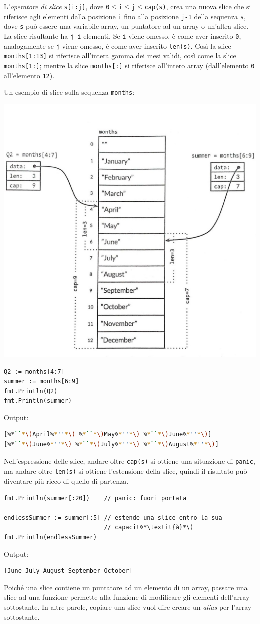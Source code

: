 L'\textit{operatore di slice} \verb|s[i:j]|, dove \verb|0|$\le$\verb|i|$\le$\verb|j|$\le$\verb|cap(s)|, crea una nuova slice che si riferisce agli elementi dalla posizione \verb|i| fino alla posizione \verb|j-1| della sequenza \verb|s|, dove \verb|s| può essere una variabile array, un puntatore ad un array o un'altra slice.
La slice risultante ha \verb|j-i| elementi.
Se \verb|i| viene omesso, è come aver inserito \verb|0|, analogamente se \verb|j| viene omesso, è come aver inserito \verb|len(s)|.
Così la slice \verb|months[1:13]| si riferisce all'intera gamma dei mesi validi, così come la slice \verb|months[1:]|;
mentre la slice \verb|months[:]| si riferisce all'intero array (dall'elemento \verb|0| all'elemento \verb|12|).

Un esempio di slice sulla sequenza \verb|months|:
\begin{center}
    \includegraphics[width=0.5\linewidth]{figures/figura3.1}
\end{center}
\begin{lstlisting}[frame=single, label={lst:lstlisting3-2.2}]
Q2 := months[4:7]
summer := months[6:9]
fmt.Println(Q2)
fmt.Println(summer)
\end{lstlisting}
Output:
\begin{lstlisting}[language=bash, frame=L, label={lst:lstlisting3-2.3}]
[%*``*\)April%*''*\) %*``*\)May%*''*\) %*``*\)June%*''*\)]
[%*``*\)June%*''*\) %*``*\)July%*''*\) %*``*\)August%*''*\)]
\end{lstlisting}
Nell'espressione delle slice, andare oltre \verb|cap(s)| si ottiene una situazione di \verb|panic|, ma andare oltre \verb|len(s)| si ottiene l'estensione della slice, quindi il risultato può diventare più ricco di quello di partenza.
\begin{lstlisting}[frame=single, label={lst:lstlisting3-2.4}]
fmt.Println(summer[:20])    // panic: fuori portata

endlessSummer := summer[:5] // estende una slice entro la sua
                            // capacit%*\textit{à}*\)
fmt.Println(endlessSummer)
\end{lstlisting}
Output:
\begin{lstlisting}[language=bash, frame=L, label={lst:lstlisting3-2.5}]
[June July August September October]
\end{lstlisting}
Poiché una slice contiene un puntatore ad un elemento di un array, passare una slice ad una funzione permette alla funzione di modificare gli elementi dell'array sottostante.
In altre parole, copiare una slice vuol dire creare un \textit{alias} per l'array sottostante.

